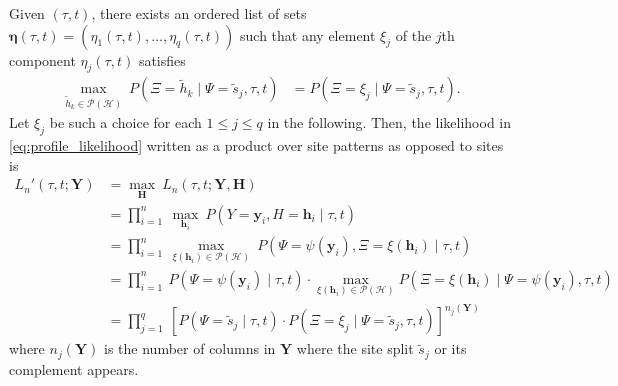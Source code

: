 \documentclass[a4paper]{article}
\newcommand{\fullAlignment}{\mathbf{Y}}
\newcommand{\alignmentColumn}{\mathbf{y}}
\newcommand{\alignmentColumnRV}{Y}
\newcommand{\siteSplit}{\tilde{s}}
\newcommand{\fullAncestralStates}{\mathbf{H}}
\newcommand{\ancestralStateColumn}{\mathbf{h}}
\newcommand{\ancestralStateColumnRV}{H}
\newcommand{\ancestralSplit}{\tilde{h}}
\newcommand{\ancestralSplitSet}{\mathcal{H}}
\newcommand{\ancestralSplitPartition}{\eta}
\newcommand{\fullAncestralSplitPartitions}{\boldsymbol\eta}
\newcommand{\patternToSplit}{\psi}
\newcommand{\ancestralToSplit}{\xi}
\newcommand{\siteSplitRV}{\Psi}
\newcommand{\ancestralSplitRV}{\Xi}
\newcommand{\nCols}{n}
\newcommand{\nSiteSplits}{q}
\begin{document}
Given $(\tau, t)$, there exists an ordered list of sets $\fullAncestralSplitPartitions(\tau, t)=(\ancestralSplitPartition_1(\tau, t),\ldots,\ancestralSplitPartition_\nSiteSplits(\tau, t))$ such that any element $\xi_j$ of the $j$th component $\ancestralSplitPartition_j(\tau, t)$ satisfies
\begin{align*}
\max_{\ancestralSplit_k\in\mathcal{P}(\ancestralSplitSet)} \ P(\ancestralSplitRV=\ancestralSplit_k \mid \siteSplitRV=\siteSplit_j, \tau, t) &= P(\ancestralSplitRV = \xi_j \mid \siteSplitRV=\siteSplit_j, \tau, t).
\end{align*}
Let $\xi_j$ be such a choice for each $1 \leq j \leq q$ in the following.
Then, the likelihood in \eqref{eq:profile_likelihood} written as a product over site patterns as opposed to sites is
\begin{align}
L_\nCols'(\tau, t; \fullAlignment) &= \max_{\fullAncestralStates} \ L_\nCols(\tau, t; \fullAlignment, \fullAncestralStates) \\
                             &= \prod_{i=1}^{\nCols} \ \max_{\ancestralStateColumn_i} \ P(\alignmentColumnRV=\alignmentColumn_i, \ancestralStateColumnRV=\ancestralStateColumn_i \mid \tau, t) \\
                             &= \prod_{i=1}^{\nCols} \ \max_{\ancestralToSplit(\ancestralStateColumn_i)\in\mathcal{P}(\ancestralSplitSet)} \ P(\siteSplitRV=\patternToSplit(\alignmentColumn_i), \ancestralSplitRV=\ancestralToSplit(\ancestralStateColumn_i) \mid \tau, t) \\
                             &= \prod_{i=1}^{\nCols} \ P(\siteSplitRV=\patternToSplit(\alignmentColumn_i) \mid \tau, t) \cdot \max_{\ancestralToSplit(\ancestralStateColumn_i)\in\mathcal{P}(\ancestralSplitSet)} P(\ancestralSplitRV=\ancestralToSplit(\ancestralStateColumn_i) \mid \siteSplitRV=\patternToSplit(\alignmentColumn_i), \tau, t) \\
                             &= \prod_{j=1}^{\nSiteSplits} \ \left[P(\siteSplitRV=\siteSplit_j \mid \tau, t)\cdot P(\ancestralSplitRV=\xi_j \mid \siteSplitRV=\siteSplit_j, \tau, t)\right] ^{\nCols_j(\fullAlignment)} \label{eq:site_pattern_likelihood}
\end{align}
where $\nCols_j(\fullAlignment)$ is the number of columns in $\fullAlignment$ where the site split $\siteSplit_j$ or its complement appears.
\end{document}
